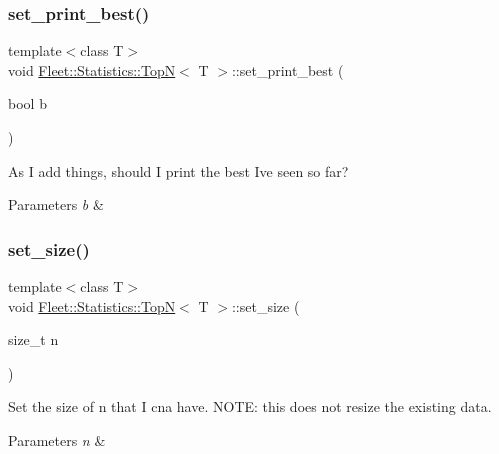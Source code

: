 \subsubsection{\texorpdfstring{set\+\_\+print\+\_\+best()}{set\_print\_best()}}
{\footnotesize\ttfamily template$<$class T$>$ \\
void \hyperlink{class_fleet_1_1_statistics_1_1_top_n}{Fleet\+::\+Statistics\+::\+TopN}$<$ T $>$\+::set\+\_\+print\+\_\+best (\begin{DoxyParamCaption}\item[{bool}]{b }\end{DoxyParamCaption})\hspace{0.3cm}{\ttfamily [inline]}}

As I add things, should I print the best I\textquotesingle{}ve seen so far? 
\begin{DoxyParams}{Parameters}
{\em b} & \\
\hline
\end{DoxyParams}
\mbox{\label{class_fleet_1_1_statistics_1_1_top_n_a3151da8c2aaab75195d6f702fbfba436}} 
\subsubsection{\texorpdfstring{set\+\_\+size()}{set\_size()}}
{\footnotesize\ttfamily template$<$class T$>$ \\
void \hyperlink{class_fleet_1_1_statistics_1_1_top_n}{Fleet\+::\+Statistics\+::\+TopN}$<$ T $>$\+::set\+\_\+size (\begin{DoxyParamCaption}\item[{size\+\_\+t}]{n }\end{DoxyParamCaption})\hspace{0.3cm}{\ttfamily [inline]}}

Set the size of n that I cna have. N\+O\+TE\+: this does not resize the existing data. 
\begin{DoxyParams}{Parameters}
{\em n} & \\
\hline
\end{DoxyParams}
\mbox{\label{class_fleet_1_1_statistics_1_1_top_n_a0ce96f95fbac59ba2a858b66b5a6690a}} 
